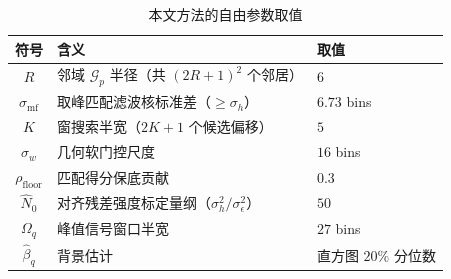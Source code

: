 \begin{table}[!t]
\centering
\caption{本文方法的自由参数取值}
\label{tab:impl}\small\setlength{\tabcolsep}{1pt}
\begin{tabular}{@{}cll@{}}
\toprule
符号 & 含义 & 取值 \\
\midrule
$R$ & 邻域 $\mathcal{G}_p$ 半径（共 $(2R{+}1)^2$ 个邻居） & $6$ \\
$\sigma_{\mathrm{mf}}$ & 取峰匹配滤波核标准差（$\ge\sigma_h$） & $6.73$ bins \\
$K$ & 窗搜索半宽（$2K{+}1$ 个候选偏移） & $5$ \\
$\sigma_w$ & 几何软门控尺度 & $16$ bins \\
$\rho_{\mathrm{floor}}$ & 匹配得分保底贡献 & $0.3$ \\
$\hat N_0$ & 对齐残差强度标定量纲（$\sigma_h^2/\sigma_\epsilon^2$） & $50$ \\
$\Omega_q$ & 峰值信号窗口半宽 & $27$ bins \\
$\hat\beta_q$ & 背景估计 & 直方图 $20\%$ 分位数 \\
\bottomrule
\end{tabular}
\end{table}
